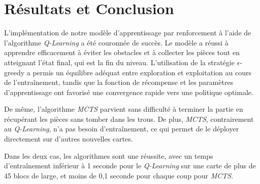 \documentclass[a4paper,12pt]{article}
\begin{document}
    \section{Résultats et Conclusion}
    
        L'implémentation de notre modèle d'apprentissage par renforcement à l'aide de l'algorithme \textit{Q-Learning} a été couronnée de succès. Le modèle a réussi à apprendre efficacement à éviter les obstacles et à collecter les pièces tout en atteignant l'état final, qui est la fin du niveau. L'utilisation de la stratégie $\epsilon$-greedy a permis un équilibre adéquat entre exploration et exploitation au cours de l'entraînement, tandis que la fonction de récompense et les paramètres d'apprentissage ont favorisé une convergence rapide vers une politique optimale.
        
        De même, l'algorithme \textit{MCTS} parvient sans difficulté à terminer la partie en récupérant les pièces sans tomber dans les trous. De plus, \textit{MCTS}, contrairement au \textit{Q-Learning}, n'a pas besoin d'entraînement, ce qui permet de le déployer directement sur d'autres nouvelles cartes.

        Dans les deux cas, les algorithmes sont une réussite, avec un temps d'entraînement inférieur à 1 seconde pour le \textit{Q-Learning} sur une carte de plus de 45 blocs de large, et moins de 0,1 seconde pour chaque coup pour \textit{MCTS}.
\end{document}
